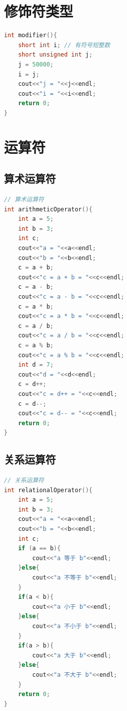 \documentclass[12pt,twiside,a4paper]{ctexbook}
\numberwithin{chapter}{part}
\begin{document}
\chapter{修饰符类型}
\begin{lstlisting}[language=C++]
int modifier(){
	short int i; // 有符号短整数
	short unsigned int j;
	j = 50000;
	i = j;
	cout<<"j = "<<j<<endl;	
	cout<<"i = "<<i<<endl;	
	return 0;
}
\end{lstlisting}

\chapter{运算符}
\section{算术运算符}
\begin{lstlisting}[language=C++]
// 算术运算符
int arithmeticOperator(){
	int a = 5;
	int b = 3;
	int c;
	cout<<"a = "<<a<<endl;
	cout<<"b = "<<b<<endl;
	c = a + b;
	cout<<"c = a + b = "<<c<<endl;
	c = a - b;
	cout<<"c = a - b = "<<c<<endl;
	c = a * b;
	cout<<"c = a * b = "<<c<<endl;
	c = a / b;
	cout<<"c = a / b = "<<c<<endl;
	c = a % b;
	cout<<"c = a % b = "<<c<<endl;
	int d = 7;
	cout<<"d = "<<d<<endl;
	c = d++;
	cout<<"c = d++ = "<<c<<endl;
	c = d--;
	cout<<"c = d-- = "<<c<<endl;
	return 0;
}
\end{lstlisting}

\section{关系运算符}
\begin{lstlisting}[language=C++]
// 关系运算符
int relationalOperator(){
	int a = 5;
	int b = 3;
	cout<<"a = "<<a<<endl;
	cout<<"b = "<<b<<endl;
	int c;
	if (a == b){
		cout<<"a 等于 b"<<endl;
	}else{
		cout<<"a 不等于 b"<<endl;
	}
	if(a < b){
		cout<<"a 小于 b"<<endl;
	}else{
		cout<<"a 不小于 b"<<endl;
	}
	if(a > b){
		cout<<"a 大于 b"<<endl;
	}else{
		cout<<"a 不大于 b"<<endl;
	}
	return 0;
}
\end{lstlisting}
\end{document}
